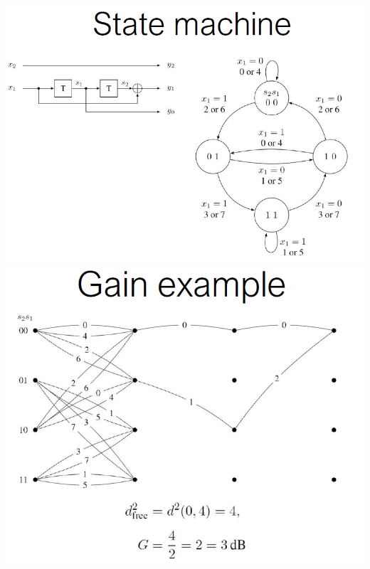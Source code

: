 \begin{multicols*}{4}
    \includegraphics[width=\columnwidth]{images/merde9.png}
    \includegraphics[width=\columnwidth]{images/merde10.png}
\end{multicols*}

